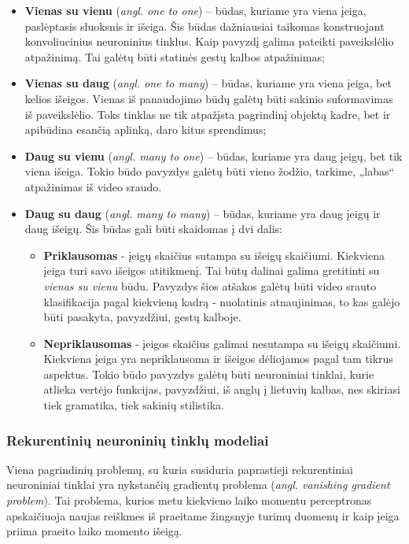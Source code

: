 \documentclass{VUMIFPSbakalaurinis}
\begin{document}
\begin{itemize}
	\item \textbf{Vienas su vienu} (\textit{angl. one to one}) – būdas, kuriame yra viena įeiga, paslėptasis sluoksnis ir išeiga. Šis būdas dažniausiai taikomas konstruojant konvoliucinius neuroninius tinklus. Kaip pavyzdį galima pateikti paveikslėlio atpažinimą. Tai galėtų būti statinės gestų kalbos atpažinimas;
	\item \textbf{Vienas su daug} (\textit{angl. one to many}) – būdas, kuriame yra viena įeiga, bet kelios išeigos. Vienas iš panaudojimo būdų galėtų būti sakinio suformavimas iš paveikslėlio. Toks tinklas ne tik atpažįsta pagrindinį objektą kadre, bet ir apibūdina esančią aplinką, daro kitus sprendimus;
	\item \textbf{Daug su vienu} (\textit{angl. many to one}) – būdas, kuriame yra daug įeigų, bet tik viena išeiga. Tokio būdo pavyzdys galėtų būti vieno žodžio, tarkime, „labas“ atpažinimas iš video sraudo.
	\item \textbf{Daug su daug} (\textit{angl. many to many}) – būdas, kuriame yra daug įeigų ir daug išeigų. Šis būdas gali būti skaidomas į dvi dalis:
	\begin{itemize}
		\item \textbf{Priklausomas} - įeigų skaičius sutampa su išeigų skaičiumi. Kiekviena įeiga turi savo išeigos atitikmenį. Tai būtų dalinai galima gretitinti su \textit{vienas su vienu} būdu. Pavyzdys šios atšakos galėtų būti video srauto klasifikacija pagal kiekvieną kadrą - nuolatinis atnaujinimas, to kas galėjo būti pasakyta, pavyzdžiui, gestų kalboje.
		\item \textbf{Nepriklausomas} - įeigos skaičius galimai nesutampa su išeigų skaičiumi. Kiekviena įeiga yra nepriklausoma ir išeigos dėliojamos pagal tam tikrus aspektus. Tokio būdo pavyzdys galėtų būti neuroniniai tinklai, kurie atlieka vertėjo funkcijas, pavyzdžiui, iš anglų į lietuvių kalbas, nes skiriasi tiek gramatika, tiek sakinių stilistika.
	\end{itemize}
\end{itemize}

\subsubsection{Rekurentinių neuroninių tinklų modeliai}

Viena pagrindinių problemų, su kuria susiduria paprastieji rekurentiniai neuroniniai tinklai yra nykstančių gradientų problema (\textit{angl. vanishing gradient problem}). Tai problema, kurios metu kiekvieno laiko momentu perceptronas apskaičiuoja naujas reiškmes iš praeitame žingsnyje turimų duomenų ir kaip įeiga priima praeito laiko momento išeigą. 
\end{document}
